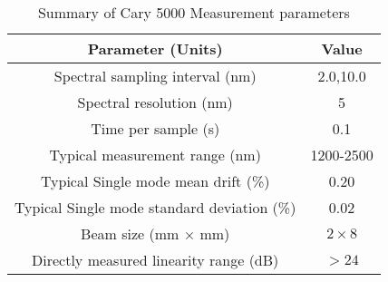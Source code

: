 \begin{table}[h!]
\caption{Summary of Cary 5000 Measurement parameters \label{tabCary5000pars}}
\begin{center}
\begin{tabular}{ c c }
\hline
        Parameter (Units) & Value \\ 
\hline
        Spectral sampling interval (nm) & 2.0,10.0 \\
        Spectral resolution (nm) & 5 \\
        Time per sample (s) & 0.1 \\
        Typical measurement range (nm) & 1200-2500 \\
		Typical Single mode mean drift (\%) & 0.20 \\
		Typical Single mode standard deviation (\%) & 0.02 \\
 		Beam size (mm $\times$ mm) & $2 \times 8$ \\
        Directly measured linearity range (dB) & $>24$ \\
    \hline
    \end{tabular}
\end{center}
\end{table}
